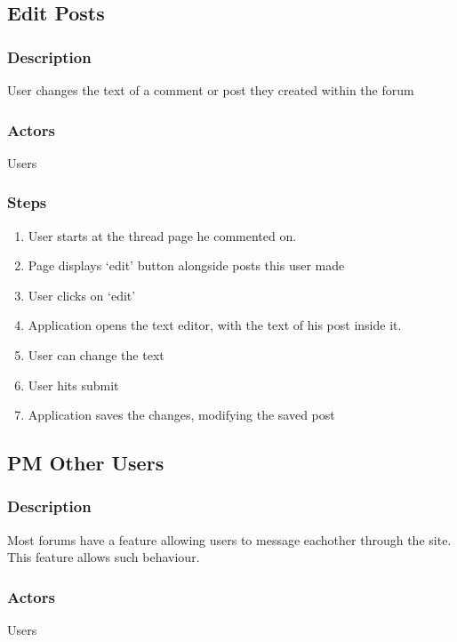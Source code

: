 \documentclass[12pt]{scrartcl}
\begin{document}
\subsection{Edit Posts}
\subsubsection{Description}

User changes the text of a comment or post they created within the forum

\subsubsection{Actors}

Users

\subsubsection{Steps}

\begin{enumerate}
\item User starts at the thread page he commented on.
\item Page displays ‘edit’ button alongside posts this user made
\item User clicks on ‘edit’
\item Application opens the text editor, with the text of his post inside it.
\item User can change the text
\item User hits submit
\item  Application saves the changes, modifying the saved post
\end{enumerate}

\subsection{PM Other Users}
\subsubsection{Description}

Most forums have a feature allowing users to message eachother through the site. This
feature allows such behaviour.

\subsubsection{Actors}

Users
\end{document}
